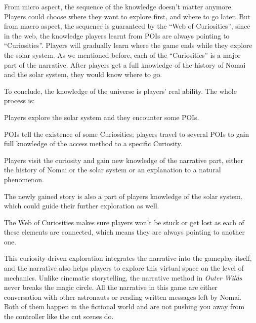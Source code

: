 \documentclass[doc, biblatex]{apa6}
\begin{document}
From micro aspect, the sequence of the knowledge doesn't matter anymore. Players
could choose where they want to explore first, and where to go later. But from
macro aspect, the sequence is guaranteed by the ``Web of Curiosities'', since in
the web, the knowledge players learnt from POIs are always pointing to
``Curiosities''. Players will gradually learn where the game ends while they
explore the solar system. As we mentioned before, each of the ``Curiosities'' is
a major part of the narrative. After players get a full knowledge of the history
of Nomai and the solar system, they would know where to go.

To conclude, the knowledge of the universe is players' real ability. The
whole process is:
\begin{APAitemize}
\item Players explore the solar system and they encounter some POIs.
\item POIs tell the existence of some Curiosities; players travel to several
  POIs to gain full knowledge of the access method to a specific Curiosity.
\item Players visit the curiosity and gain new knowledge of the narrative part,
  either the history of Nomai or the solar system or an explanation to a natural
  phenomenon.
\item The newly gained story is also a part of players knowledge of the solar system,
which could guide their further exploration as well.
\end{APAitemize}
The Web of Curiosities makes sure players won't be stuck or get lost as each of
these elements are connected, which means they are always pointing to another
one.

This curiosity-driven exploration integrates the narrative into the gameplay
itself, and the narrative also helps players to explore this virtual space
on the level of mechanics. Unlike cinematic storytelling, the narrative method in
\textit{Outer Wilds} never breaks the magic circle. All the narrative in this
game are either conversation with other astronauts or reading written messages
left by Nomai. Both of them happen in the fictional world and are not pushing
you away from the controller like the cut scenes do.
\end{document}
